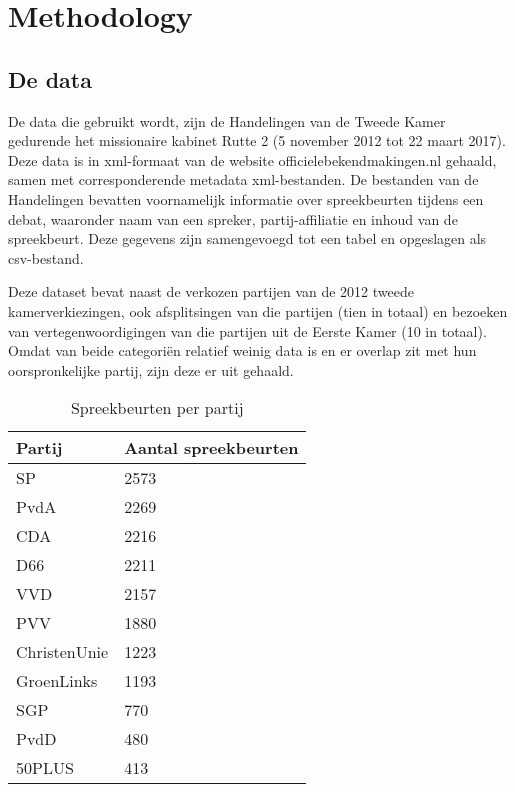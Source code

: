 \section{Methodology}
\label{sec:meth}


\subsection{De data}
De data die gebruikt wordt, zijn de Handelingen van de Tweede Kamer gedurende het missionaire kabinet Rutte 2 (5 november 2012 tot 22 maart 2017). Deze data is in xml-formaat van de website officielebekendmakingen.nl gehaald, samen met corresponderende metadata xml-bestanden. De bestanden van de Handelingen bevatten voornamelijk informatie over spreekbeurten tijdens een debat, waaronder naam van een spreker, partij-affiliatie en inhoud van de spreekbeurt. Deze gegevens zijn samengevoegd tot een tabel en opgeslagen als csv-bestand.\par
Deze dataset bevat naast de verkozen partijen van de 2012 tweede kamerverkiezingen, ook afsplitsingen van die partijen (tien in totaal) en bezoeken van vertegenwoordigingen van die partijen uit de Eerste Kamer (10 in totaal). Omdat van beide categori\"{e}n relatief weinig data is en er overlap zit met hun oorspronkelijke partij, zijn deze er uit gehaald.

\begin{table}[H]
\centering
\caption{Spreekbeurten per partij}
\label{Sprpartij}
\begin{tabular}{|l|l|}
\hline
Partij       & Aantal spreekbeurten \\ \hline
SP           & 2573 \\ \hline
PvdA         & 2269 \\ \hline
CDA          & 2216 \\ \hline
D66          & 2211 \\ \hline
VVD          & 2157 \\ \hline
PVV          & 1880 \\ \hline
ChristenUnie & 1223 \\ \hline
GroenLinks   & 1193 \\ \hline
SGP          & 770  \\ \hline
PvdD         & 480  \\ \hline
50PLUS       & 413  \\ \hline
\end{tabular}
\end{table}

